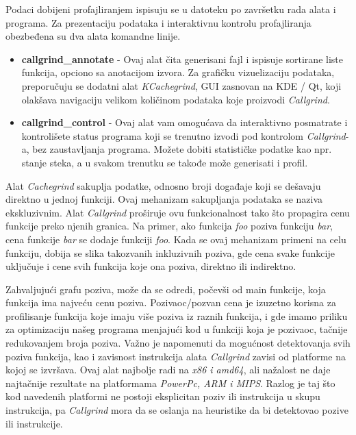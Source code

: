 \documentclass[12pt,oneside]{memoir}
\theoremstyle{plain}
\theoremstyle{definition}
\begin{document}
Podaci dobijeni profajliranjem ispisuju se u datoteku po završetku rada alata i programa. Za prezentaciju podataka i interaktivnu kontrolu profajliranja obezbeđena su dva alata komandne linije.
\begin{itemize}
\item \textbf{callgrind\_annotate} - Ovaj alat čita generisani fajl i ispisuje sortirane liste funkcija, opciono sa anotacijom izvora. Za grafičku vizuelizaciju podataka, preporučuju se dodatni alat \textit{KCachegrind}, GUI zasnovan na KDE / Qt, koji olakšava navigaciju velikom količinom podataka koje proizvodi \textit{Callgrind}.
\item \textbf{callgrind\_control} - Ovaj alat vam omogućava da interaktivno posmatrate i kontrolišete status programa koji se trenutno izvodi pod kontrolom \textit{Callgrind}-a, bez zaustavljanja programa. Možete dobiti statističke podatke kao npr. stanje steka, a u svakom trenutku se takođe može generisati i profil.
\end{itemize}

Alat \textit{Cachegrind} sakuplja podatke, odnosno broji događaje koji se dešavaju direktno u jednoj funkciji. Ovaj mehanizam sakupljanja podataka se naziva ekskluzivnim. Alat \textit{Callgrind} proširuje ovu funkcionalnost tako što propagira cenu funkcije preko njenih granica. Na primer, ako funkcija \textit{foo} poziva funkciju \textit{bar}, cena funkcije \textit{bar} se dodaje funkciji \textit{foo}. Kada se ovaj mehanizam primeni na celu funkciju, dobija se slika takozvanih inkluzivnih poziva, gde cena svake funkcije uključuje i cene svih funkcija koje ona poziva, direktno ili indirektno.

Zahvaljujući grafu poziva, može da se odredi, počevši od main funkcije, koja funkcija ima najveću cenu poziva. Pozivaoc/pozvan cena je izuzetno korisna za profilisanje funkcija koje imaju više poziva iz raznih funkcija, i gde imamo priliku za optimizaciju našeg programa menjajući kod u funkciji koja je pozivaoc, tačnije redukovanjem broja poziva. Važno je napomenuti da mogućnost detektovanja svih poziva funkcija, kao i zavisnost instrukcija alata \textit{Callgrind} zavisi od platforme na kojoj se izvršava. Ovaj alat najbolje radi na \textit{x86 i amd64}, ali nažalost ne daje najtačnije rezultate na platformama \textit{PowerPc, ARM i MIPS}. Razlog je taj što kod navedenih platformi ne postoji eksplicitan poziv ili instrukcija u skupu instrukcija, pa \textit{Callgrind} mora da se oslanja na heuristike da bi detektovao pozive ili instrukcije.
\end{document}
